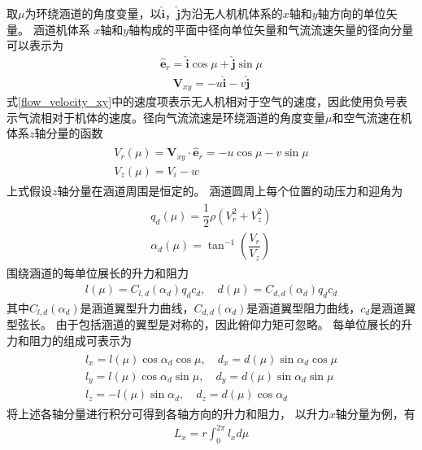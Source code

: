 取$ \mu $为环绕涵道的角度变量，以$ \hat{\bm{i}} $，$ \hat{\bm{j}} $为沿无人机机体系的$ x $轴和$ y $轴方向的单位矢量。 涵道机体系 $x $轴和$ y $轴构成的平面中径向单位矢量和气流流速矢量的径向分量可以表示为\cite{Johnson_2005}
\begin{align}\hat{\bm{e}}_{{r}}=\hat{\bm{i}} \cos \mu+\hat{\bm{j}} \sin \mu\end{align}
\begin{align}
\bm{V}_{{x y}}=-u \hat{\bm{i}}-v \hat{\bm{j}}	\label{flow_velocity_xy}
\end{align}
式\eqref{flow_velocity_xy}中的速度项表示无人机相对于空气的速度，因此使用负号表示气流相对于机体的速度。径向气流流速是环绕涵道的角度变量$ \mu $和空气流速在机体系$ z $轴分量的函数
\begin{align}\begin{array}{c}
V_{r}(\mu)=\bm{V}_{{xy}} \cdot \hat{\bm{e}}_{{r}}=-u \cos \mu-v \sin \mu \\
V_{z}(\mu)=V_{i}-w
\end{array}\end{align}
上式假设$ z $轴分量在涵道周围是恒定的。 涵道圆周上每个位置的动压力和迎角为
\begin{align}
\begin{array}{c}
q_{d}(\mu)=\dfrac{1}{2} \rho\left(V_{r}^{2}+V_{z}^{2}\right) \\
\alpha_{d}(\mu)=\tan ^{-1}\left(\dfrac{V_{r}}{V_{z}}\right)
\end{array}
\end{align}
围绕涵道的每单位展长的升力和阻力
\begin{align}l(\mu)=C_{l, d}(\alpha_d) q_{d} c_{d}, \quad d(\mu)=C_{d, d}(\alpha_d) q_{d} c_{d}\end{align}
其中$ C_{l, d}(\alpha_d) $是涵道翼型升力曲线，$ C_{d, d}(\alpha_d) $是涵道翼型阻力曲线，$ c_d $是涵道翼型弦长。 由于包括涵道的翼型是对称的，因此俯仰力矩可忽略。 每单位展长的升力和阻力的组成可表示为
\begin{align}
\begin{array}{cl}
l_{x}=l(\mu) \cos \alpha_d \cos \mu ,\quad d_{x}=d(\mu) \sin \alpha_d \cos \mu \\
l_{y}=l(\mu) \cos \alpha_d \sin \mu ,\quad d_{y}=d(\mu) \sin \alpha_d \sin \mu \\
l_{z}=-l(\mu) \sin \alpha_d ,\quad d_{z}=d(\mu) \cos \alpha_d
\end{array}
\end{align}
将上述各轴分量进行积分可得到各轴方向的升力和阻力， 以升力$ x $轴分量为例，有
\begin{align}
L_{x}=r \int_{0}^{2 \pi} l_{x} d \mu
\end{align}
